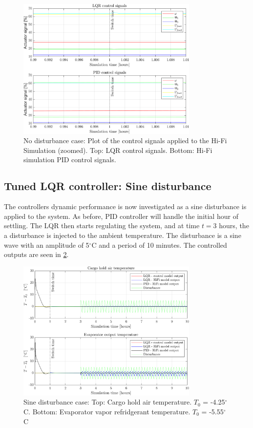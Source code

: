 \begin{figure}[H]
	\centering
	\includegraphics[width=0.8\textwidth]{Graphics/fig_inputs_noDist_zoom.png}
	\caption{No disturbance case: Plot of the control signals applied to the Hi-Fi Simulation (zoomed). Top: LQR control signals. Bottom: Hi-Fi simulation PID control signals.}
	\label{fig:inputs_noDist_zoom}
\end{figure}

\newpage
\subsection{Tuned LQR controller: Sine disturbance}
The controllers dynamic performance is now investigated as a sine disturbance is applied to the system. As before, PID controller will handle the initial hour of settling. The LQR then starts regulating the system, and at time $t=3$ hours, the a disturbance is injected to the ambient temperature. The disturbance is a sine wave with an amplitude of 5$^{\circ}$C and a period of 10 minutes. The controlled outputs are seen in \cref{fig:LQR_wellTuned_sineDist}.

\begin{figure}[H]
	\centering
	\includegraphics[width=0.8\textwidth]{Graphics/fig_LQRvsKresten_sineDist.png}
	\caption{Sine disturbance case: Top: Cargo hold air temperature. $T_0$ = -4.25$^{\circ}$C. Bottom: Evaporator vapor refridgerant temperature. $T_0$ = -5.55$^{\circ}$C}
	\label{fig:LQR_wellTuned_sineDist}
\end{figure}

